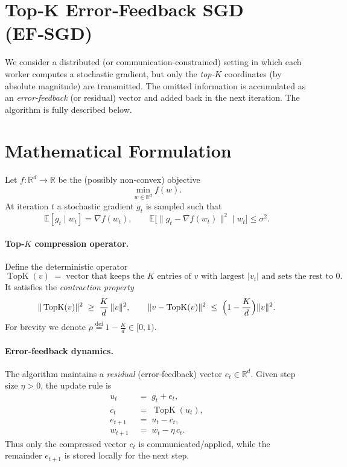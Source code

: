\documentclass{article}
\newcommand{\E}{\mathbb{E}}
\newcommand{\R}{\mathbb{R}}
\newcommand{\topK}{\operatorname{TopK}}
\begin{document}
\section*{Top‑K Error‑Feedback SGD (EF‑SGD)}
We consider a distributed (or communication‑constrained) setting in which each worker computes a stochastic gradient, but only the \emph{top‑$K$} coordinates (by absolute magnitude) are transmitted.  The omitted information is accumulated as an \emph{error‑feedback} (or residual) vector and added back in the next iteration.  The algorithm is fully described below.

\section*{Mathematical Formulation}
Let $f:\R^{d}\rightarrow\R$ be the (possibly non‑convex) objective
\[
\min_{w\in\R^{d}} f(w) .
\]
At iteration $t$ a stochastic gradient $g_t$ is sampled such that
\[
\E[g_t\mid w_t]=\nabla f(w_t),\qquad 
\E\bigl[\|g_t-\nabla f(w_t)\|^{2}\mid w_t\bigr]\le\sigma^{2}.
\]

\paragraph{Top‑$K$ compression operator.}
Define the deterministic operator
\[
\topK(v)\;=\; \text{vector that keeps the $K$ entries of $v$ with largest }|v_i|\text{ and sets the rest to $0$}.
\]
It satisfies the \emph{contraction property}
\begin{equation}
\label{eq:contraction}
\| \topK(v) \|^{2}\;\ge\;\frac{K}{d}\,\|v\|^{2},
\qquad
\| v-\topK(v) \|^{2}\;\le\;\Bigl(1-\frac{K}{d}\Bigr)\|v\|^{2}.
\end{equation}
For brevity we denote $\rho\stackrel{\text{def}}{=}1-\frac{K}{d}\in[0,1)$.

\paragraph{Error‑feedback dynamics.}
The algorithm maintains a \emph{residual} (error‑feedback) vector $e_t\in\R^{d}$.
Given step size $\eta>0$, the update rule is
\begin{align}
u_t &\;=\; g_t + e_t, \label{eq:u}\\
c_t &\;=\; \topK(u_t), \label{eq:c}\\
e_{t+1} &\;=\; u_t - c_t, \label{eq:e}\\
w_{t+1} &\;=\; w_t - \eta\,c_t .\label{eq:w}
\end{align}
Thus only the compressed vector $c_t$ is communicated/applied, while the remainder $e_{t+1}$ is stored locally for the next step.
\end{document}
